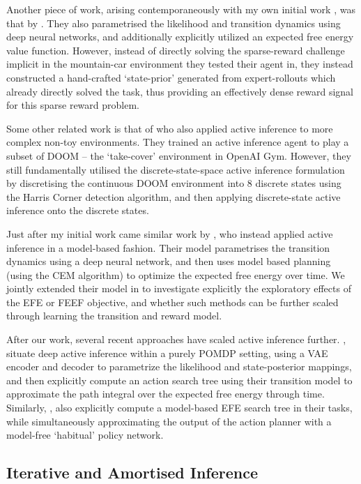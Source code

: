 Another piece of work, arising contemporaneously with my own initial work \citep{millidge2019combining,millidge_deep_2019}, was that by \citet{catal_Bayesian_2019}. They also parametrised the likelihood and transition dynamics using deep neural networks, and additionally explicitly utilized an expected free energy value function. However, instead of directly solving the sparse-reward challenge implicit in the mountain-car environment they tested their agent in, they instead constructed a hand-crafted `state-prior' generated from expert-rollouts which already directly solved the task, thus providing an effectively dense reward signal for this sparse reward problem.

Some other related work is that of \citet{cullen2018active} who also applied active inference to more complex non-toy environments. They trained an active inference agent to play a subset of DOOM -- the `take-cover' environment in OpenAI Gym. However, they still fundamentally utilised the discrete-state-space active inference formulation by discretising the continuous DOOM environment into 8 discrete states using the Harris Corner detection algorithm, and then applying discrete-state active inference onto the discrete states. 

Just after my initial work came similar work by \citet{tschantz_scaling_2019}, who instead applied active inference in a model-based fashion. Their model parametrises the transition dynamics using a deep neural network, and then uses model based planning (using the CEM algorithm) to optimize the expected free energy over time. We jointly extended their model in \citet{tschantz2020reinforcement} to investigate explicitly the exploratory effects of the EFE or FEEF objective, and whether such methods can be further scaled through learning the transition and reward model.

After our work, several recent approaches have scaled active inference further. \citet{ccatal2020learning}, situate deep active inference within a purely POMDP setting, using a VAE encoder and decoder to parametrize the likelihood and state-posterior mappings, and then explicitly compute an action search tree using their transition model to approximate the path integral over the expected free energy through time. Similarly, \citet{fountas2020deep}, also explicitly compute a model-based EFE search tree in their tasks, while simultaneously approximating the output of the action planner with a model-free `habitual' policy network.

\subsection{Iterative and Amortised Inference}

